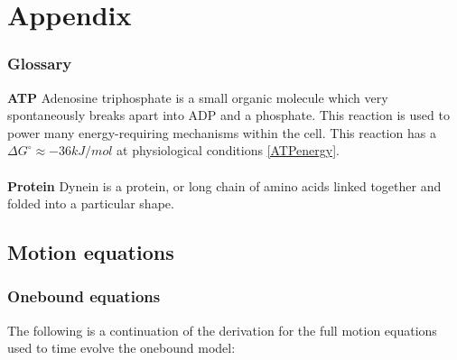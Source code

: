 \documentclass[10pt]{article} %
\begin{document}



\section{Appendix}

\subsubsection{Glossary}
\textbf{ATP} Adenosine triphosphate is a small organic molecule which very spontaneously breaks apart into ADP and a phosphate. This reaction is used to power many energy-requiring mechanisms within the cell. This reaction has a $\Delta G^\circ \approx -36 kJ/mol$ at physiological conditions \ref{ATPenergy}.\\\\
\textbf{Protein} Dynein is a protein, or long chain of amino acids linked together and folded into a particular shape.\\

\subsection{Motion equations}

\subsubsection{Onebound equations}
\label{onebound-motion-equations}
The following is a continuation of the derivation for the full motion equations used to time evolve the onebound model:
\end{document}
